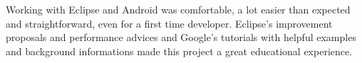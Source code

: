 Working with Eclipse and Android was comfortable, a lot easier than expected and straightforward, even for a first time developer. Eclipse's improvement proposals and performance advices and Google's tutorials with helpful examples and background informations made this project a great educational experience.